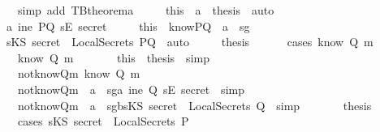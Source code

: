 \begin{isabellebody}
\ \ \ \ \ \ \isamarkupfalse \ {\isacharparenleft}simp\ add{\isacharcolon}\ TBtheorem{}a{\isacharparenright}\isanewline
\ \ \ \ \isamarkupfalse \ this\ \ a{}\ \isamarkupfalse \ {\isacharquery}thesis\ \isamarkupfalse \ auto\isanewline
\ \ \isamarkupfalse \isanewline
\ \ \ \ \isamarkupfalse \ a{}{}{\isacharcolon}{\isachardoublequoteopen}{\isasymnot}\ ine\ PQ\ {\isacharparenleft}sE\ secret{\isacharparenright}{\isachardoublequoteclose}\isanewline
\ \ \ \ \isamarkupfalse \ this\ \ knowPQ\ \ a{}\ \isamarkupfalse \ sg{}{\isacharcolon}\isanewline
\ \ \ \ \ {\isachardoublequoteopen}sKS\ secret\ {\isasymin}\ LocalSecrets\ PQ{\isachardoublequoteclose}\ \isamarkupfalse \ auto\isanewline
\ \ \ \ \isamarkupfalse \ {\isacharquery}thesis\ \isanewline
\ \ \ \ \isamarkupfalse \ {\isacharparenleft}cases\ {\isachardoublequoteopen}know\ Q\ m{\isachardoublequoteclose}{\isacharparenright}\isanewline
\ \ \ \ \ \ \isamarkupfalse \ {\isachardoublequoteopen}know\ Q\ m{\isachardoublequoteclose}\isanewline
\ \ \ \ \ \ \isamarkupfalse \ this\ \isamarkupfalse \ {\isacharquery}thesis\ \isamarkupfalse \ simp\isanewline
\ \ \ \ \isamarkupfalse \ \isanewline
\ \ \ \ \ \ \isamarkupfalse \ not{\isacharunderscore}knowQm{\isacharcolon}{\isachardoublequoteopen}{\isasymnot}\ know\ Q\ m{\isachardoublequoteclose}\isanewline
\ \ \ \ \ \ \isamarkupfalse \ not{\isacharunderscore}knowQm\ \ a{}\ \isamarkupfalse \ sg{}a{\isacharcolon}{\isachardoublequoteopen}{\isasymnot}\ ine\ Q\ {\isacharparenleft}sE\ secret{\isacharparenright}{\isachardoublequoteclose}\ \isamarkupfalse \ simp\isanewline
\ \ \ \ \ \ \isamarkupfalse \ not{\isacharunderscore}knowQm\ \ a{}\ \isamarkupfalse \ sg{}b{\isacharcolon}{\isachardoublequoteopen}sKS\ secret\ {\isasymnotin}\ LocalSecrets\ Q{\isachardoublequoteclose}\ \isamarkupfalse \ simp\isanewline
\ \ \ \ \ \ \isamarkupfalse \ {\isacharquery}thesis\isanewline
\ \ \ \ \ \ \isamarkupfalse \ {\isacharparenleft}cases\ {\isachardoublequoteopen}sKS\ secret\ {\isasymin}\ LocalSecrets\ P{\isachardoublequoteclose}{\isacharparenright}\isanewline

\end{isabellebody}
